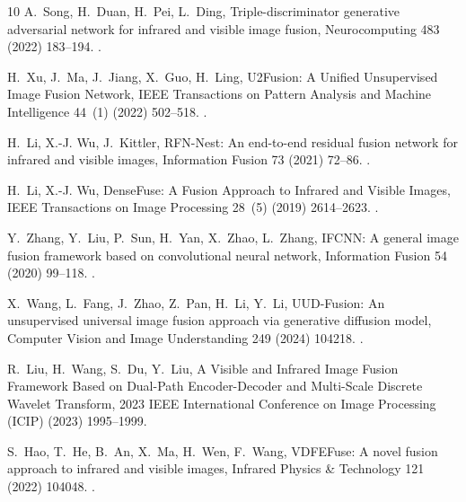 \begin{thebibliography}{10}
A.~Song, H.~Duan, H.~Pei, L.~Ding, {Triple-discriminator generative adversarial
  network for infrared and visible image fusion}, Neurocomputing 483 (2022)
  183--194.
\newblock \href {https://doi.org/10.1016/j.neucom.2022.02.025}
  {}.

H.~Xu, J.~Ma, J.~Jiang, X.~Guo, H.~Ling, {U2Fusion: A Unified Unsupervised
  Image Fusion Network}, IEEE Transactions on Pattern Analysis and Machine
  Intelligence 44~(1) (2022) 502--518.
\newblock \href {https://doi.org/10.1109/tpami.2020.3012548}
  {}.

H.~Li, X.-J. Wu, J.~Kittler, {RFN-Nest: An end-to-end residual fusion network
  for infrared and visible images}, Information Fusion 73 (2021) 72--86.
\newblock \href {https://doi.org/10.1016/j.inffus.2021.02.023}
  {}.

H.~Li, X.-J. Wu, {DenseFuse: A Fusion Approach to Infrared and Visible Images},
  IEEE Transactions on Image Processing 28~(5) (2019) 2614--2623.
\newblock \href {https://doi.org/10.1109/tip.2018.2887342}
  {}.

Y.~Zhang, Y.~Liu, P.~Sun, H.~Yan, X.~Zhao, L.~Zhang, {IFCNN: A general image
  fusion framework based on convolutional neural network}, Information Fusion
  54 (2020) 99--118.
\newblock \href {https://doi.org/10.1016/j.inffus.2019.07.011}
  {}.

X.~Wang, L.~Fang, J.~Zhao, Z.~Pan, H.~Li, Y.~Li, {UUD-Fusion: An unsupervised
  universal image fusion approach via generative diffusion model}, Computer
  Vision and Image Understanding 249 (2024) 104218.
\newblock \href {https://doi.org/10.1016/j.cviu.2024.104218}
  {}.

R.~Liu, H.~Wang, S.~Du, Y.~Liu, {A Visible and Infrared Image Fusion Framework
  Based on Dual-Path Encoder-Decoder and Multi-Scale Discrete Wavelet
  Transform}, 2023 IEEE International Conference on Image Processing (ICIP)
  (2023) 1995--1999\newblock \href {https://doi.org/10.1109/icip49359.2023.10222863}
  {}.

S.~Hao, T.~He, B.~An, X.~Ma, H.~Wen, F.~Wang, {VDFEFuse: A novel fusion
  approach to infrared and visible images}, Infrared Physics \& Technology 121
  (2022) 104048.
\newblock \href {https://doi.org/10.1016/j.infrared.2022.104048}
  {}.


\end{thebibliography}
